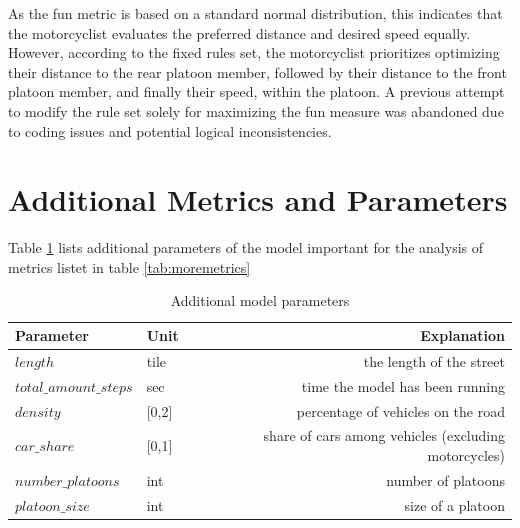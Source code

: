 As the fun metric is based on a standard normal distribution, this indicates that the motorcyclist evaluates the preferred distance and desired speed equally. However, according to the fixed rules set, the motorcyclist prioritizes optimizing their distance to the rear platoon member, followed by their distance to the front platoon member, and finally their speed, within the platoon. A previous attempt to modify the rule set solely for maximizing the fun measure was abandoned due to coding issues and potential logical inconsistencies.



\section{Additional Metrics and Parameters}
\label{sec:Additional Metrics and Parameters}
Table \ref{tab:moreparameters} lists additional parameters of the model important for the analysis of metrics listet in table \ref{tab:moremetrics}

    \begin{table}[htb]
    \centering
    \begin{tabular}{@{}llr@{}} \toprule
        Parameter                   & Unit          & Explanation        \\ \midrule
        $length$                    & tile          & the length of the street \\
        $total\_amount\_steps$        & sec           & time the model has been running \\
        $density$                   & [0,2]         & percentage of vehicles on the road \\
        $car\_share$                 & [0,1]         & share of cars among vehicles (excluding motorcycles) \\
        $number\_platoons$           & int           & number of platoons \\
        $platoon\_size$              & int           & size of a platoon \\ \bottomrule
    \end{tabular}
    \caption{Additional model parameters} 
    \label{tab:moreparameters}
    \end{table}


